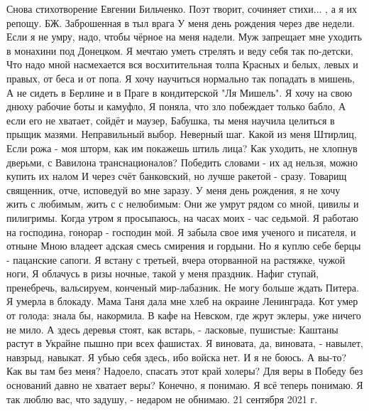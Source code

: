 Снова стихотворение Евгении Бильченко. Поэт творит, сочиняет  стихи... , а я их репощу. 
БЖ. Заброшенная в тыл врага
У меня день рождения через две недели.
Если я не умру, надо, чтобы чёрное на меня надели.
Муж запрещает мне уходить в монахини под Донецком.
Я мечтаю уметь стрелять и веду себя так по-детски,
Что надо мной насмехается вся восхитительная толпа
Красных и белых, левых и правых, от беса и от попа.
Я хочу научиться нормально так попадать в мишень,
А не сидеть в Берлине и в Праге в кондитерской "Ля Мишель".
Я хочу на свою днюху рабочие боты и камуфло,
Я поняла, что зло побеждает только бабло,
А если его не хватает, сойдёт и маузер,
Бабушка, ты меня научила целиться в прыщик мазями.
Неправильный выбор. Неверный шаг. Какой из меня Штирлиц,
Если рожа - моя шторм, как им покажешь штиль лица?
Как уходить, не хлопнув дверьми, с Вавилона транснационалов?
Победить словами - их ад нельзя, можно купить их налом
И через счёт банковский, но лучше ракетой - сразу.
Товарищ священник, отче, исповедуй во мне заразу.
У меня день рождения, я не хочу жить с любимым, жить с с нелюбимым:
Они же умрут рядом со мной, цивилы и пилигримы.
Когда утром я просыпаюсь, на часах моих - час седьмой.
Я работаю на господина, гонорар - господин мой.
Я забыла свое имя ученого и писателя, и отныне
Мною владеет адская смесь смирения и гордыни.
Но я куплю себе берцы - пацанские сапоги.
Я встану с третьей, вчера оторванной на растяжке, чужой ноги,
Я облачусь в ризы ночные, такой у меня праздник.
Нафиг ступай, пренебречь, вальсируем, конченый мир-лабазник.
Не могу больше ждать Питера. Я умерла в блокаду.
Мама Таня дала мне хлеб на окраине Ленинграда.
Кот умер от голода: знала бы, накормила.
В кафе на Невском, где жрут эклеры, уже ничего не мило.
А здесь деревья стоят, как встарь, - ласковые, пушистые:
Каштаны растут в Украйне пышно при всех фашистах.
Я виновата, да, виновата, - навылет, навзрыд, навыкат.
Я убью себя здесь, ибо войска нет. И я не боюсь.
А вы-то?
Как вы там без меня? Надоело, спасать этот край холеры?
Для веры в Победу без оснований давно не хватает веры?
Конечно, я понимаю. Я всё теперь понимаю.
Я так люблю вас, что задушу, - недаром не обнимаю.
21 сентября 2021 г.
